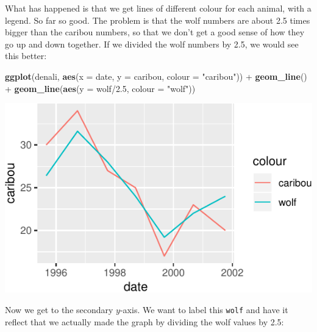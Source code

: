 \documentclass[]{tufte-book}
\newenvironment{Shaded}{}{}
\newcommand{\DataTypeTok}[1]{\textcolor[rgb]{0.56,0.13,0.00}{#1}}
\newcommand{\FloatTok}[1]{\textcolor[rgb]{0.25,0.63,0.44}{#1}}
\newcommand{\KeywordTok}[1]{\textcolor[rgb]{0.00,0.44,0.13}{\textbf{#1}}}
\newcommand{\NormalTok}[1]{#1}
\newcommand{\OperatorTok}[1]{\textcolor[rgb]{0.40,0.40,0.40}{#1}}
\newcommand{\StringTok}[1]{\textcolor[rgb]{0.25,0.44,0.63}{#1}}
\theoremstyle{definition}
\theoremstyle{definition}
\theoremstyle{definition}
\theoremstyle{remark}
\begin{document}
What has happened is that we get lines of different colour for each
animal, with a legend. So far so good. The problem is that the wolf
numbers are about 2.5 times bigger than the caribou numbers,
so that we don't get a good sense of how they go up and down together.
If we divided the wolf numbers by 2.5, we would see this better:

\begin{Shaded}
\begin{Highlighting}[]
\KeywordTok{ggplot}\NormalTok{(denali, }\KeywordTok{aes}\NormalTok{(}\DataTypeTok{x =}\NormalTok{ date, }\DataTypeTok{y =}\NormalTok{ caribou, }\DataTypeTok{colour =} \StringTok{"caribou"}\NormalTok{)) }\OperatorTok{+}\StringTok{ }
\StringTok{    }\KeywordTok{geom_line}\NormalTok{() }\OperatorTok{+}\StringTok{ }\KeywordTok{geom_line}\NormalTok{(}\KeywordTok{aes}\NormalTok{(}\DataTypeTok{y =}\NormalTok{ wolf}\OperatorTok{/}\FloatTok{2.5}\NormalTok{, }
    \DataTypeTok{colour =} \StringTok{"wolf"}\NormalTok{))}
\end{Highlighting}
\end{Shaded}

\includegraphics{13-dates-and-times_files/figure-latex/unnamed-chunk-40-1}

Now we get to the secondary \(y\)-axis. We want to label this
\texttt{wolf} and have it reflect that we actually made the graph by
dividing the wolf values by 2.5:
\end{document}
